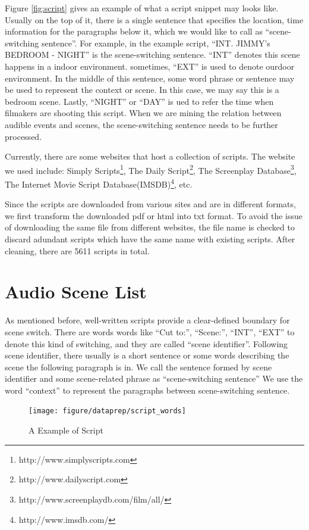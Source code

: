 Figure \ref{fig:script} gives an example of what a script snippet may looks like. Usually on the top of it, there is a single sentence that specifies the location, time information for the paragraphs below it, which we would like to call as ``scene-switching sentence''. 
For example, in the example script, ``INT. JIMMY's BEDROOM - NIGHT'' is the scene-switching sentence. 
``INT'' denotes this scene happens in a indoor environment. 
sometimes, ``EXT'' is used to denote ourdoor environment. 
In the middle of this sentence, some word phrase or sentence may be used to represent the context or scene. 
In this case, we may say this is a bedroom scene. 
Lastly, ``NIGHT'' or ``DAY'' is ued to refer the time when filmakers are shooting this script. 
When we are mining the relation between audible events and scenes, the scene-switching sentence needs to be further processed. 

Currently, there are some websites that host a collection of scripts. 
The website we used include: Simply Scripts\footnote{http://www.simplyscripts.com}, The Daily Script\footnote{http://www.dailyscript.com}, The Screenplay Database\footnote{http://www.screenplaydb.com/film/all/}, The Internet Movie Script Database(IMSDB)\footnote{http://www.imsdb.com/}, etc. 

Since the scripts are downloaded from various sites and are in different formats, we first transform the downloaded pdf or html into txt format. 
To avoid the issue of downloading the same file from different websites, the file name is checked to discard adundant scripts which have the same name with existing scripts. 
After cleaning, there are 5611 scripts in total. 

\section{Audio Scene List}
As mentioned before, well-written scripts provide a clear-defined boundary for scene switch. 
There are words words like ``Cut to:'', ``Scene:'', ``INT'', ``EXT'' to denote this kind of switching, and they are called ``scene identifier''.  
Following scene identifier, there usually is a short sentence or some words describing the scene the following paragraph is in. 
We call the sentence formed by scene identifier and some scene-related phrase as ``scene-switching sentence''
We use the word ``context'' to represent the paragraphs between scene-switching sentence. 

\begin{figure}[htb]
\centering
\hspace*{-0.5cm}
\texttt{[image: figure/dataprep/script\_words]}
\caption{A Example of Script}
\label{fig:script_words}
\end{figure}

